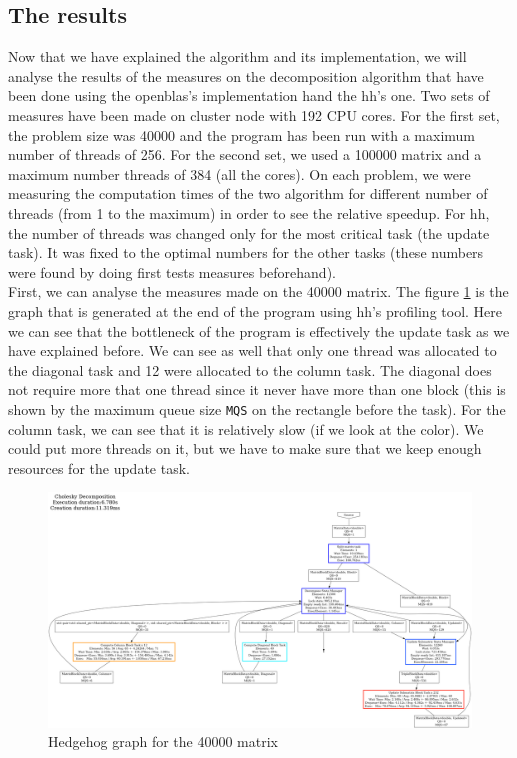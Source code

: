 \clearpage{}
\subsection{The results}
\label{sec:chores}

Now that we have explained the algorithm and its implementation, we will analyse
the results of the measures on the decomposition algorithm that have been done
using the openblas's implementation hand the \gls{hh}'s one. Two sets of
measures have been made on cluster node with 192 CPU cores. For the first set,
the problem size was 40000 and the program has been run with a maximum number of
threads of 256. For the second set, we used a 100000 matrix and a maximum number
threads of 384 (all the cores). On each problem, we were measuring the
computation times of the two algorithm for different number of threads (from 1
to the maximum) in order to see the relative speedup. For \gls{hh}, the number
of threads was changed only for the most critical task (the update task). It was
fixed to the optimal numbers for the other tasks (these numbers were found by
doing first tests measures beforehand).\\

First, we can analyse the measures made on the 40000 matrix. The figure
\ref{fig:40000graph} is the graph that is generated at the end of the program
using \gls{hh}'s profiling tool. Here we can see that the bottleneck of the
program is effectively the update task as we have explained before. We can see
as well that only one thread was allocated to the diagonal task and 12 were
allocated to the column task. The diagonal does not require more that one thread
since it never have more than one block (this is shown by the maximum queue size
\texttt{MQS} on the rectangle before the task). For the column task, we can see
that it is relatively slow (if we look at the color). We could put more threads
on it, but we have to make sure that we keep enough resources for the update
task.

\begin{figure}[!ht]
  \begin{center}
    \includegraphics[scale=0.15]{img/cho-img/40000.png}
    \caption{Hedgehog graph for the 40000 matrix}
    \label{fig:40000graph}
  \end{center}
\end{figure}

